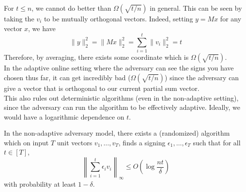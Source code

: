For $t \le n$, we cannot do better than $\Omega(\sqrt{t/n})$ in general. This can be seen by taking the $v_i$ to be mutually orthogonal vectors. Indeed, setting $y = Mx$ for any vector $x$, we have
\[ \|y\|_2^2 = \|Mx\|_2^2 = \sum_{i=1}^t \|v_i\|_2^2 = t \]
Therefore, by averaging, there exists some coordinate which is $\Omega(\sqrt{t/n})$.\\

In the adaptive online setting where the adversary can see the signs you have chosen thus far, it can get incredibly bad ($\Omega(\sqrt{t/n})$) since the adversary can give a vector that is orthogonal to our current partial sum vector. \\
This also rules out deterministic algorithms (even in the non-adaptive setting), since the adversary can run the algorithm to be effectively adaptive. Ideally, we would have a logarithmic dependence on $t$. 

\begin{ftheo}
	In the non-adaptive adversary model, there exists a (randomized) algorithm which on input $T$ unit vectors $v_1,\ldots,v_T$, finds a signing $\epsilon_1,\ldots,\epsilon_T$ such that for all $t \in [T]$, 
	\[ \left\| \sum_{i=1}^t \epsilon_i v_i \right\|_\infty \le O\left( \log \frac{nt}{\delta} \right) \]
	with probability at least $1-\delta$.
\end{ftheo}

